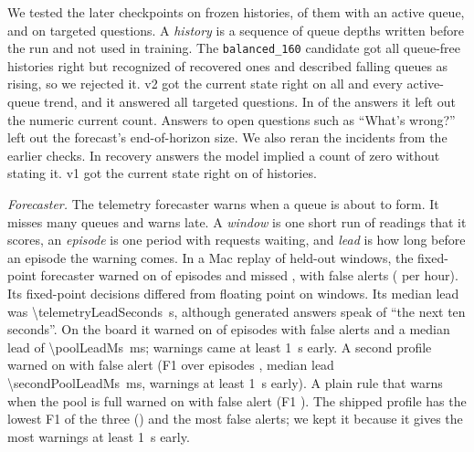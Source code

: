 \documentclass[conference,10pt,letterpaper]{IEEEtran}
\newcommand{\seconds}[1]{\SI{#1}{\second}}
\newcommand{\ms}[1]{\SI{#1}{\milli\second}}
\begin{document}
We tested the later checkpoints on \historyCases{} frozen histories, \historyActive{} of them with an active queue, and on \historyTargeted{} targeted questions. A \emph{history} is a sequence of queue depths written before the run and not used in training. The \texttt{balanced\_160} candidate got all \balancedFreeTotal{} queue-free histories right but recognized \balancedRecovered{} of \balancedRecoveredTotal{} recovered ones and described falling queues as rising, so we rejected it. v2 got the current state right on all \historyCases{} and every active-queue trend, and it answered all \historyTargeted{} targeted questions. In \historyCountMissing{} of the \historyCases{} answers it left out the numeric current count. Answers to open questions such as ``What's wrong?'' left out the forecast's end-of-horizon size. We also reran the \historyArchived{} incidents from the earlier checks. In \historyOmittedZero{} recovery answers the model implied a count of zero without stating it. v1 got the current state right on \originalStatesRight{} of \originalStatesTotal{} histories.

\emph{Forecaster.} The telemetry forecaster warns when a queue is about to form. It misses many queues and warns late. A \emph{window} is one short run of readings that it scores, an \emph{episode} is one period with requests waiting, and \emph{lead} is how long before an episode the warning comes. In a Mac replay of \telemetryWindows{} held-out windows, the fixed-point forecaster warned on \telemetryFixedWarned{} of \telemetryEpisodes{} episodes and missed \telemetryFixedMissed, with \telemetryFixedFalse{} false alerts (\telemetryFalsePerHour{} per hour). Its fixed-point decisions differed from floating point on \telemetryFlips{} windows. Its median lead was \seconds{\telemetryLeadSeconds}, although generated answers speak of ``the next ten seconds''. On the board it warned on \poolWarned{} of \poolEpisodes{} episodes with \poolFalseAlerts{} false alerts and a median lead of \ms{\poolLeadMs}; \poolEarly{} warnings came at least \seconds{1} early. A second profile warned on \secondPoolWarned{} with \secondPoolFalse{} false alert (F1 over episodes \secondPoolFoneScore, median lead \ms{\secondPoolLeadMs}, \secondPoolEarly{} warnings at least \seconds{1} early). A plain rule that warns when the pool is full warned on \capacityWarned{} with \capacityFalse{} false alert (F1 \capacityFoneScore). The shipped profile has the lowest F1 of the three (\poolFoneScore) and the most false alerts; we kept it because it gives the most warnings at least \seconds{1} early.
\end{document}
